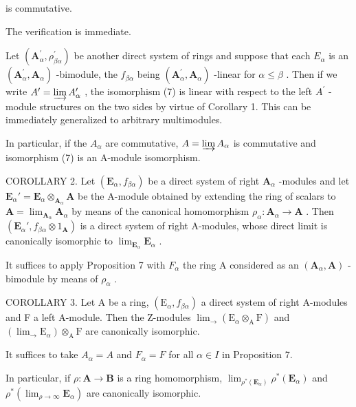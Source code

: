 is commutative.

The verification is immediate.

Let \((\mathbf{A}_{\alpha}^{\prime}, \rho_{\beta\alpha}^{\prime})\) be another direct system of rings and suppose that each \(E_{\alpha}\) is an \((\mathbf{A}_{\alpha}^{\prime}, \mathbf{A}_{\alpha})\) -bimodule, the \(f_{\beta\alpha}\) being \((\mathbf{A}_{\alpha}^{\prime}, \mathbf{A}_{\alpha})\) -linear for \(\alpha \leqslant \beta\) . Then if we write \(A^{\prime} = \varinjlim A_{\alpha}^{\prime}\) , the isomorphism (7) is linear with respect to the left \(A^{\prime}\) -module structures on the two sides by virtue of Corollary 1. This can be immediately generalized to arbitrary multimodules.

In particular, if the \(A_{\alpha}\) are commutative, \(A = \varinjlim A_{\alpha}\) is commutative and isomorphism (7) is an A-module isomorphism.

COROLLARY 2. Let \((\mathbf{E}_{\alpha}, f_{\beta \alpha})\) be a direct system of right \(\mathbf{A}_{\alpha}\) -modules and let \(\mathbf{E}_{\alpha}' = \mathbf{E}_{\alpha} \otimes_{\mathbf{A}_{\alpha}} \mathbf{A}\) be the A-module obtained by extending the ring of scalars to \(\mathbf{A} = \lim_{\mathbf{A}_{\alpha}} \mathbf{A}_{\alpha}\) by means of the canonical homomorphism \(\rho_{\alpha}: \mathbf{A}_{\alpha} \to \mathbf{A}\) . Then \((\mathbf{E}_{\alpha}', f_{\beta \alpha} \otimes 1_{\mathbf{A}})\) is a direct system of right A-modules, whose direct limit is canonically isomorphic to \(\lim_{\mathbf{E}_{\alpha}} \mathbf{E}_{\alpha}\) .

It suffices to apply Proposition 7 with \(F_{\alpha}\) the ring A considered as an \((\mathbf{A}_{\alpha}, \mathbf{A})\) -bimodule by means of \(\rho_{\alpha}\) .

COROLLARY 3. Let A be a ring, \((\mathrm{E}_{\alpha}, f_{\beta\alpha})\) a direct system of right A-modules and F a left A-module. Then the Z-modules \(\lim_{\longrightarrow} (\mathrm{E}_{\alpha} \otimes_{\mathrm{A}} \mathrm{F})\) and \((\lim_{\longrightarrow} \mathrm{E}_{\alpha}) \otimes_{\mathrm{A}} \mathrm{F}\) are canonically isomorphic.

It suffices to take \(A_{\alpha} = A\) and \(F_{\alpha} = F\) for all \(\alpha \in I\) in Proposition 7.

In particular, if \(\rho: \mathbf{A} \to \mathbf{B}\) is a ring homomorphism, \(\lim_{\rho^* (\mathbf{E}_\alpha)} \rho^*(\mathbf{E}_\alpha)\) and \(\rho^*(\lim_{\rho \to \infty} \mathbf{E}_\alpha)\) are canonically isomorphic.

